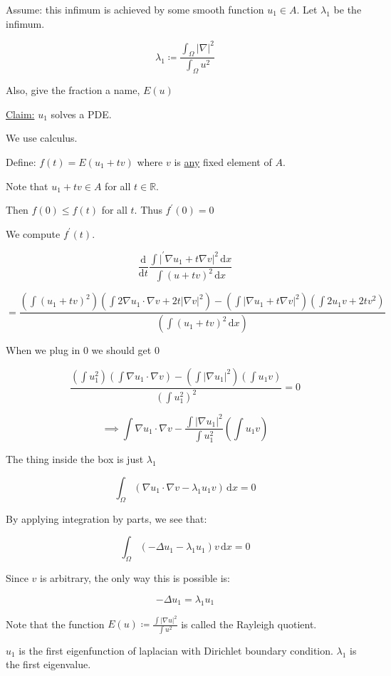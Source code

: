 \documentclass{article}
\theoremstyle{definition}
\begin{document}
Assume: this infimum is achieved by some smooth function \(u_1\in A\). Let \(\lambda_1\) be the infimum.

\[
    \lambda_1 \coloneqq \dfrac{\int_\Omega \vert \nabla  \vert ^ 2 }{\int_\Omega u^2}
\]

Also, give the fraction a name, \(E(u)\) 

\underline{Claim:} \(u_1\) solves a PDE.

We use calculus. 

Define: \(f(t)=E(u_1 + tv)\) where \(v\) is \underline{any} fixed element of \(A\).

Note that \(u_1 + tv\in A\) for all \(t\in\mathbb{R}\).

Then \(f(0)\leq f(t)\)  for all \(t\). Thus \(f^{\prime} (0)=0\) 

We compute \(f^{\prime} (t)\).

\[
    \frac{\mathrm{d}}{\mathrm{d}t} \frac{\int \vert ^{\prime} \nabla u_1 + t \nabla v \vert ^2 \, \mathrm{d}x}{\int (u + tv)^2\,\mathrm{d}x }
\]

\[
    =\dfrac{(\int (u_1 + tv)^2)(\int 2 \nabla u_1 \cdot \nabla v + 2t \vert \nabla v \vert ^2)-(\int \vert \nabla u_1 + t \nabla v \vert ^2)(\int 2 u_1 v + 2tv^2)}{\left( \int (u_1 + tv)^2\,\mathrm{d}x  \right) }
\]

When we plug in \(0\) we should get \(0\)

\[
    \dfrac{(\int u_1^2)(\int \nabla u_1\cdot \nabla v)-(\int \vert \nabla u_1 \vert ^2)(\int u_1 v)}{(\int u_1^2)^2} = 0
\]

\[
    \implies \int \nabla u_1 \cdot \nabla v - \boxed{\frac{\int \vert \nabla u_1 \vert ^2}{\int u_1^2}}(\int u_1 v)
\]

The thing inside the box is just \(\lambda_1\) 

\[
    \int_\Omega (\nabla u_1\cdot \nabla v - \lambda_1 u_1 v)\,\mathrm{d}x = 0 
\]

By applying integration by parts, we see that:

\[
    \int_\Omega (- \Delta u_1 - \lambda_1 u_1)v\,\mathrm{d} x = 0
\]

Since \(v\) is arbitrary, the only way this is possible is:

\[
    -\Delta u_1 = \lambda_1 u_1
\]

Note that the function \(E(u)\coloneqq \frac{\int \vert \nabla u \vert ^2}{\int u^2}\) is called the Rayleigh quotient.

\(u_1\) is the first eigenfunction of laplacian with Dirichlet boundary condition. \(\lambda_1\) is the first eigenvalue.
\end{document}
